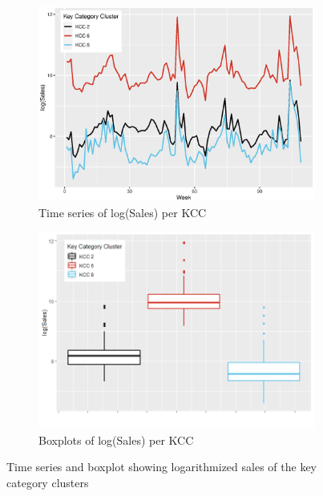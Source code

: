  \begin{figure}[H]
\centering
\begin{subfigure}{.45\textwidth}
  \centering
  \includegraphics[width=\linewidth]{figures/ts_log_sales_kcc.eps}
  \caption{Time series of log(Sales) per KCC}
  \label{fig:ts_log_sales_kcc}
\end{subfigure}
\begin{subfigure}{.45\textwidth}
  \centering
  \includegraphics[width=\linewidth]{figures/boxplot_log_sales_kcc.png}
  \caption{Boxplots of log(Sales) per KCC}
  \label{fig:boxplot_log_sales_kcc}
\end{subfigure}
\caption{Time series and boxplot showing logarithmized sales of the key category clusters}
\label{fig:kcc_ts_and_boxplot}
\end{figure} 




